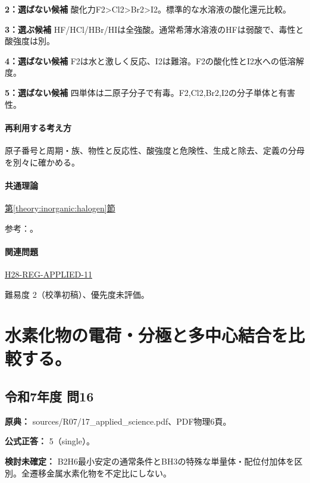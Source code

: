 \noindent\textbf{2：選ばない候補} 酸化力F2>Cl2>Br2>I2。標準的な水溶液の酸化還元比較。\par

\noindent\textbf{3：選ぶ候補} HF/HCl/HBr/HIは全強酸。通常希薄水溶液のHFは弱酸で、毒性と酸強度は別。\par

\noindent\textbf{4：選ばない候補} F2は水と激しく反応、I2は難溶。F2の酸化性とI2水への低溶解度。\par

\noindent\textbf{5：選ばない候補} 四単体は二原子分子で有毒。F2,Cl2,Br2,I2の分子単体と有害性。\par

\paragraph{再利用する考え方} 原子番号と周期・族、物性と反応性、酸強度と危険性、生成と除去、定義の分母を別々に確かめる。

\paragraph{共通理論} \hyperref[theory:inorganic:halogen]{第\ref*{theory:inorganic:halogen}節}

\par 参考：\cite{inorganic_halogen_ref,niosh_hf}。

\paragraph{関連問題} \hyperref[q:h28-reg-applied-11]{H28-REG-APPLIED-11}

\par 難易度 2（校準初稿）、優先度未評価。

\section{水素化物の電荷・分極と多中心結合を比較する。}

\subsection{令和7年度 問16}
\label{q:r07-reg-applied-16}

\noindent\textbf{原典：} sources/R07/17\_applied\_science.pdf、PDF物理6頁。

\textbf{公式正答：} 5（single）。

\par\textbf{検討未確定：} B2H6最小安定の通常条件とBH3の特殊な単量体・配位付加体を区別。全遷移金属水素化物を不定比にしない。

